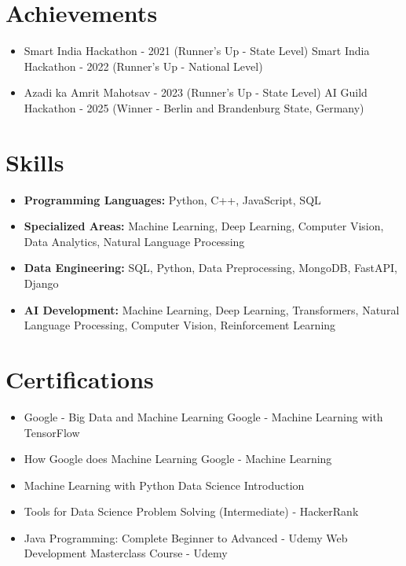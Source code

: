 \documentclass[a4paper,10pt]{article}
\begin{document}
\section*{Achievements}
\begin{itemize}
\item Smart India Hackathon - 2021 (Runner's Up - State Level) \hfill Smart India Hackathon - 2022 (Runner's Up - National Level)
\item Azadi ka Amrit Mahotsav - 2023 (Runner's Up - State Level) \hfill AI Guild Hackathon - 2025 (Winner - Berlin and Brandenburg State, Germany)
\end{itemize}

\section*{Skills}
\begin{itemize}
  \item \textbf{Programming Languages:} Python, C++, JavaScript, SQL
  \item \textbf{Specialized Areas:} Machine Learning, Deep Learning, Computer Vision, Data Analytics, Natural Language Processing
  \item \textbf{Data Engineering:} SQL, Python, Data Preprocessing, MongoDB, FastAPI, Django
  \item \textbf{AI Development:} Machine Learning, Deep Learning, Transformers, Natural Language Processing, Computer Vision, Reinforcement Learning
\end{itemize}

\section*{Certifications}
\begin{itemize}
\item Google - Big Data and Machine Learning \hfill Google - Machine Learning with TensorFlow
\item How Google does Machine Learning \hfill Google - Machine Learning
\item Machine Learning with Python \hfill Data Science Introduction
\item Tools for Data Science \hfill Problem Solving (Intermediate) - HackerRank
\item Java Programming: Complete Beginner to Advanced - Udemy \hfill Web Development Masterclass Course - Udemy
\end{itemize}
\end{document}
